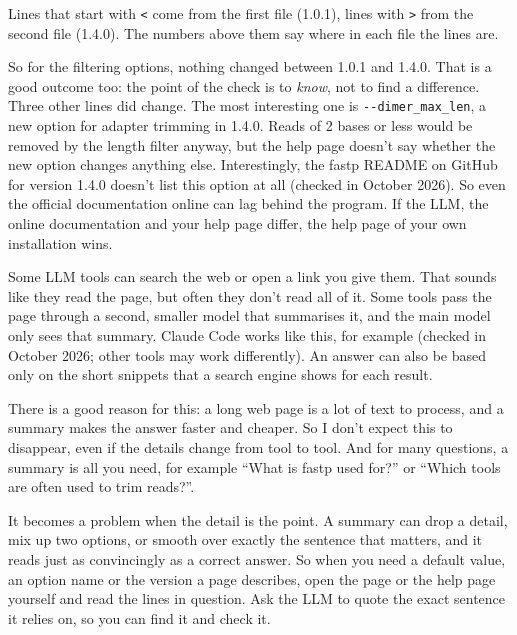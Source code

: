 \documentclass[
  letterpaper,
  DIV=11,
  numbers=noendperiod]{scrreprt}
\begin{document}
\begin{tcolorbox}
Lines that start with \texttt{\textless{}} come from the first file
(1.0.1), lines with \texttt{\textgreater{}} from the second file
(1.4.0). The numbers above them say where in each file the lines are.

So for the filtering options, nothing changed between 1.0.1 and 1.4.0.
That is a good outcome too: the point of the check is to \emph{know},
not to find a difference. Three other lines did change. The most
interesting one is \texttt{-\/-dimer\_max\_len}, a new option for
adapter trimming in 1.4.0. Reads of 2 bases or less would be removed by
the length filter anyway, but the help page doesn't say whether the new
option changes anything else. Interestingly, the fastp README on GitHub
for version 1.4.0 doesn't list this option at all (checked in October
2026). So even the official documentation online can lag behind the
program. If the LLM, the online documentation and your help page differ,
the help page of your own installation wins.

\end{tcolorbox}

\begin{tcolorbox}[enhanced jigsaw, title=\textcolor{quarto-callout-tip-color}{\faLightbulb}\hspace{0.5em}{Tip: An LLM that looks something up has not always read the page
(optional)}, rightrule=.15mm, titlerule=0mm, colframe=quarto-callout-tip-color-frame, toprule=.15mm, leftrule=.75mm, colbacktitle=quarto-callout-tip-color!10!white, bottomtitle=1mm, toptitle=1mm, arc=.35mm, opacitybacktitle=0.6, left=2mm, bottomrule=.15mm, breakable, opacityback=0, colback=white, coltitle=black]

Some LLM tools can search the web or open a link you give them. That
sounds like they read the page, but often they don't read all of it.
Some tools pass the page through a second, smaller model that summarises
it, and the main model only sees that summary. Claude Code works like
this, for example (checked in October 2026; other tools may work
differently). An answer can also be based only on the short snippets
that a search engine shows for each result.

There is a good reason for this: a long web page is a lot of text to
process, and a summary makes the answer faster and cheaper. So I don't
expect this to disappear, even if the details change from tool to tool.
And for many questions, a summary is all you need, for example ``What is
fastp used for?'' or ``Which tools are often used to trim reads?''.

It becomes a problem when the detail is the point. A summary can drop a
detail, mix up two options, or smooth over exactly the sentence that
matters, and it reads just as convincingly as a correct answer. So when
you need a default value, an option name or the version a page
describes, open the page or the help page yourself and read the lines in
question. Ask the LLM to quote the exact sentence it relies on, so you
can find it and check it.

\end{tcolorbox}
\end{document}
